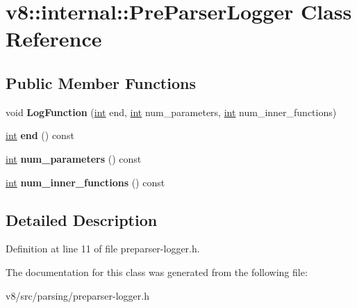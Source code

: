 \hypertarget{classv8_1_1internal_1_1PreParserLogger}{}\section{v8\+:\+:internal\+:\+:Pre\+Parser\+Logger Class Reference}
\label{classv8_1_1internal_1_1PreParserLogger}
\subsection*{Public Member Functions}
\begin{DoxyCompactItemize}
\item 
\mbox{\label{classv8_1_1internal_1_1PreParserLogger_ad6ba7923033c76fb99cf8e7987e6a1b4}} 
void {\bfseries Log\+Function} (\mbox{\hyperlink{classint}{int}} end, \mbox{\hyperlink{classint}{int}} num\+\_\+parameters, \mbox{\hyperlink{classint}{int}} num\+\_\+inner\+\_\+functions)
\item 
\mbox{\label{classv8_1_1internal_1_1PreParserLogger_a5897b7182bf6acf6e385f4ccb5f81c6b}} 
\mbox{\hyperlink{classint}{int}} {\bfseries end} () const
\item 
\mbox{\label{classv8_1_1internal_1_1PreParserLogger_a5f10348397624d5241ef153549fac732}} 
\mbox{\hyperlink{classint}{int}} {\bfseries num\+\_\+parameters} () const
\item 
\mbox{\label{classv8_1_1internal_1_1PreParserLogger_a64fdd0e4e859b8e8b76ae47db2a65ee6}} 
\mbox{\hyperlink{classint}{int}} {\bfseries num\+\_\+inner\+\_\+functions} () const
\end{DoxyCompactItemize}


\subsection{Detailed Description}


Definition at line 11 of file preparser-\/logger.\+h.



The documentation for this class was generated from the following file\+:\begin{DoxyCompactItemize}
\item 
v8/src/parsing/preparser-\/logger.\+h\end{DoxyCompactItemize}
